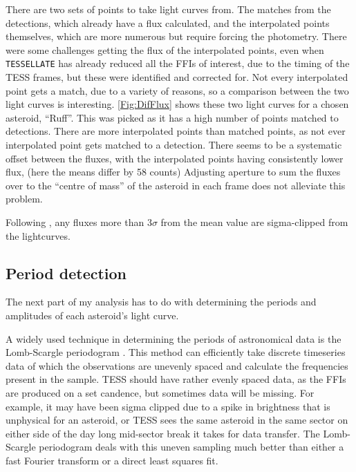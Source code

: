 \documentclass[12pt]{article}
\begin{document}
There are two sets of points to take light curves from.
The matches from the detections, which already have a flux calculated, and the interpolated points themselves, which are more numerous but require forcing the photometry.
There were some challenges getting the flux of the interpolated points, even when \texttt{TESSELLATE} has already reduced all the FFIs of interest, due to the timing of the TESS frames, but these were identified and corrected for.
Not every interpolated point gets a match, due to a variety of reasons, %
so a comparison between the two light curves is interesting.
\autoref{Fig:DifFlux} shows these two light curves for a chosen asteroid, ``Ruff''.
This was picked as it has a high number of points matched to detections.
There are more interpolated points than matched points, as not ever interpolated point gets matched to a detection.
There seems to be a systematic offset between the fluxes, with the interpolated points having consistently lower flux, (here the means differ by 58 counts)
Adjusting aperture to sum the fluxes over to the ``centre of mass'' of the asteroid in each frame does not alleviate this problem.

Following \citet{McNeill2023}, any fluxes more than $3\sigma$ from the mean value are sigma-clipped from the lightcurves. 
 


\subsection{Period detection}\label{SubSec:Periods}


The next part of my analysis has to do with determining the periods and amplitudes of each asteroid's light curve.

A widely used technique in determining the periods of astronomical data is the Lomb-Scargle periodogram \citep[\citet{Lomb1976,Scargle1982}, but see][for a review]{VanderPlas2018}.
This method can efficiently take discrete timeseries data of which the observations are unevenly spaced and calculate the frequencies present in the sample.
TESS should have rather evenly spaced data, as the FFIs are produced on a set candence, but sometimes data will be missing.
For example, it may have been sigma clipped due to a spike in brightness that is unphysical for an asteroid, or TESS sees the same asteroid in the same sector on either side of the day long mid-sector break it takes for data transfer.
The Lomb-Scargle periodogram deals with this uneven sampling much better than either a fast Fourier transform or a direct least squares fit.
\end{document}
